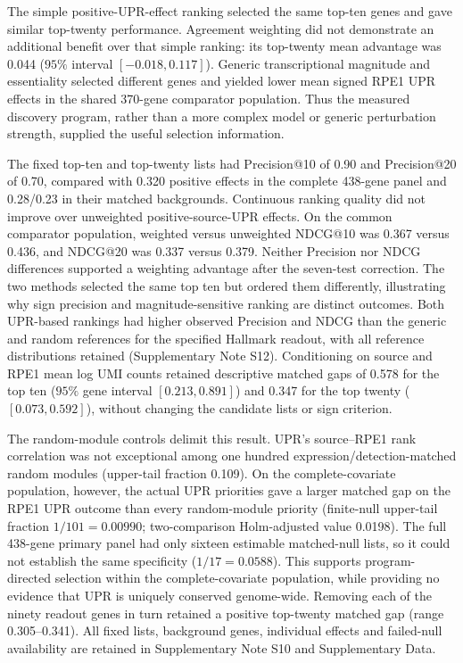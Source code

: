 \documentclass[a4paper,fleqn]{cas-sc}
\makeatletter
\DeclareRobustCommand{\rev}[1]{{\color{red}\def\@citecolor{black}\def\@linkcolor{red}\def\@urlcolor{red}#1}}
\makeatother
\begin{document}
\rev{The simple positive-UPR-effect ranking selected the same top-ten genes and gave similar top-twenty performance.} \rev{Agreement weighting did not demonstrate an additional benefit over that simple ranking: its top-twenty mean advantage was 0.044 ($95\%$ interval $[-0.018,0.117]$).} \rev{Generic transcriptional magnitude and essentiality selected different genes and yielded lower mean signed RPE1 UPR effects in the shared 370-gene comparator population.} \rev{Thus the measured discovery program, rather than a more complex model or generic perturbation strength, supplied the useful selection information.}

\rev{The fixed top-ten and top-twenty lists had Precision@10 of 0.90 and Precision@20 of 0.70, compared with 0.320 positive effects in the complete 438-gene panel and 0.28/0.23 in their matched backgrounds.} \rev{Continuous ranking quality did not improve over unweighted positive-source-UPR effects.} \rev{On the common comparator population, weighted versus unweighted NDCG@10 was 0.367 versus 0.436, and NDCG@20 was 0.337 versus 0.379.} \rev{Neither Precision nor NDCG differences supported a weighting advantage after the seven-test correction.} \rev{The two methods selected the same top ten but ordered them differently, illustrating why sign precision and magnitude-sensitive ranking are distinct outcomes.} \rev{Both UPR-based rankings had higher observed Precision and NDCG than the generic and random references for the specified Hallmark readout, with all reference distributions retained (Supplementary Note S12).} \rev{Conditioning on source and RPE1 mean log UMI counts retained descriptive matched gaps of 0.578 for the top ten ($95\%$ gene interval $[0.213,0.891]$) and 0.347 for the top twenty ($[0.073,0.592]$), without changing the candidate lists or sign criterion.}

\rev{The random-module controls delimit this result.} \rev{UPR's source--RPE1 rank correlation was not exceptional among one hundred expression/detection-matched random modules (upper-tail fraction 0.109).} \rev{On the complete-covariate population, however, the actual UPR priorities gave a larger matched gap on the RPE1 UPR outcome than every random-module priority (finite-null upper-tail fraction $1/101=0.00990$; two-comparison Holm-adjusted value 0.0198).} \rev{The full 438-gene primary panel had only sixteen estimable matched-null lists, so it could not establish the same specificity ($1/17=0.0588$).} \rev{This supports program-directed selection within the complete-covariate population, while providing no evidence that UPR is uniquely conserved genome-wide.} \rev{Removing each of the ninety readout genes in turn retained a positive top-twenty matched gap (range 0.305--0.341).} \rev{All fixed lists, background genes, individual effects and failed-null availability are retained in Supplementary Note S10 and Supplementary Data.}
\end{document}
